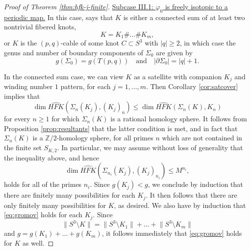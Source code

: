 \documentclass[11pt]{amsart}
\numberwithin{equation}{section}
\numberwithin{theorem}{section}
\theoremstyle{definition}
\newcommand{\Z}{\mathbb{Z}}
\newcommand\HFK{\widehat{\mathit{HFK}}}
\begin{document}
\begin{proof}[Proof of Theorem \ref{thm:hfk-j-finite}]
\underline{Subcase III.1: $\varphi_0$ is freely isotopic to a periodic map.}
In this case, \cite[Proposition 2.3]{bs-traces} says that $K$ is either a connected sum of at least two nontrivial fibered knots, \[K= K_1\#\dots \# K_m,\] or $K$ is the $(p,q)$-cable of some knot $C\subset S^3$ with $|q|\geq 2$, in which case the genus and number of boundary components of $\Sigma_0$ are given by \begin{equation}\label{eq:topology}g(\Sigma_0) = g(T(p,q)) \quad \textrm{and} \quad |\partial\Sigma_0| = |q|+1.\end{equation}  

In the connected sum case, we can view $K$ as a satellite with companion $K_j$ and winding number $1$ pattern, for each $j=1,\dots,m$. Then Corollary \ref{cor:satcover} implies that \[\dim\HFK(\Sigma_n(K_j),(K_j)_n)\leq \dim\HFK(\Sigma_n(K),K_n)\] for every $n\geq 1$ for which $\Sigma_n(K)$ is a rational homology sphere. It follows from Proposition \ref{prop:resultants} that the latter condition is met, and in fact that $\Sigma_n(K)$ is a $\Z/2$-homology sphere, for all primes $n$ which are not contained in the finite set $S_{K,2}$.
In particular, we may assume without loss of generality that the inequality above, and hence \[\dim\HFK(\Sigma_{n_i}(K_j),(K_j)_{n_i})\leq M^{n_i},\] holds for all of the primes $n_i$.  Since $g(K_j)<g$, we conclude by induction that there are finitely many possibilities for each $K_j$. It then follows that there are only finitely many possibilities for $K$, as desired. We also have by induction that \eqref{eq:gromov} holds for each $K_j$. Since \[\lVert S^3\setminus K \rVert = \lVert S^3\setminus K_1 \rVert + \dots + \lVert S^3\setminus K_m \rVert\] and $g = g(K_1)+ \dots + g(K_m)$, it follows immediately that \eqref{eq:gromov}  holds for $K$ as well.


\end{proof}
\end{document}
